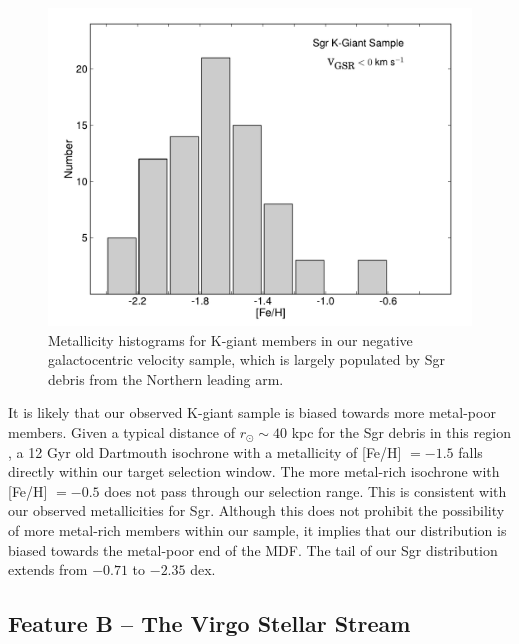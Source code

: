 	\begin{figure}[h]
		\includegraphics[width=\columnwidth]{chapter1/sgr_feh_hist.pdf}
		\caption{Metallicity histograms for K-giant members in our negative galactocentric velocity sample, which is largely populated by Sgr debris from the Northern leading arm.}
		\label{fig:sgr-metallicity-hist}
	\end{figure}

	It is likely that our observed K-giant sample is biased towards more metal-poor members. Given a typical distance of $r_\odot\sim 40$ kpc for the Sgr debris in this region \citep{Belokurov;et-al_2006}, a 12 Gyr old Dartmouth \citep{Dotter;et-al_2008} isochrone with a metallicity of [Fe/H] $= -1.5$ falls directly within our target selection window. The more metal-rich isochrone with [Fe/H] $= -0.5$ does not pass through our selection range. This is consistent with our observed metallicities for Sgr. Although this does not prohibit the possibility of more metal-rich members within our sample, it implies that our distribution is biased towards the metal-poor end of the MDF. The tail of our Sgr distribution extends from $-0.71$ to $-2.35$ dex.

	\subsection{Feature B \--- The Virgo Stellar Stream}
	\label{sec:ch1-the-vss}
	
